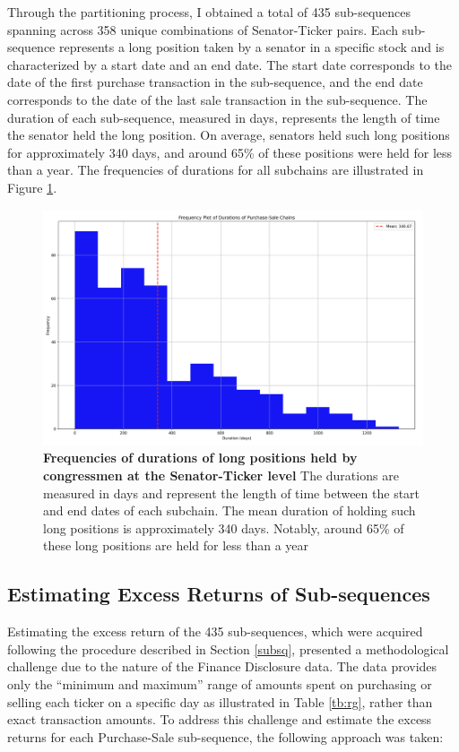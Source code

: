 \documentclass[15pt,letterpaper]{article}
\begin{document}
Through the partitioning process, I obtained a total of 435 sub-sequences spanning across 358 unique combinations of Senator-Ticker pairs.
Each sub-sequence represents a long position taken by a senator in a specific stock and is characterized by a start date and an end date.
The start date corresponds to the date of the first purchase transaction in the sub-sequence, and the end date corresponds to the date of the last sale transaction in the sub-sequence. The duration of each sub-sequence, measured in days, represents the length of time the senator held the long position. 
On average, senators held such long positions for approximately 340 days, and around 65\% of these positions were held for less than a year. The frequencies of durations for all subchains are illustrated in Figure \ref{fig:erfin}.


\begin{figure}[h]
  \centering
  \includegraphics[width=1\textwidth]{imgs/long-du.png}
  \caption{\textbf{Frequencies of durations of long positions held by congressmen at the Senator-Ticker level} The durations are measured in days and represent the length of time between the start and end dates of each subchain. The mean duration of holding such long positions is approximately 340 days. Notably, around 65\% of these long positions are held for less than a year}
  \label{fig:erfin}
\end{figure}

\subsection{Estimating Excess Returns of Sub-sequences} \label{excess}

Estimating the excess return of the 435 sub-sequences, which were acquired following the procedure described in Section \ref{subsq}, presented a methodological challenge due to the nature of the Finance Disclosure data. The data provides only the ``minimum and maximum'' range of amounts spent on purchasing or selling each ticker on a specific day as illustrated in Table \ref{tb:rg}, rather than exact transaction amounts. To address this challenge and estimate the excess returns for each Purchase-Sale sub-sequence, the following approach was taken:
\end{document}
